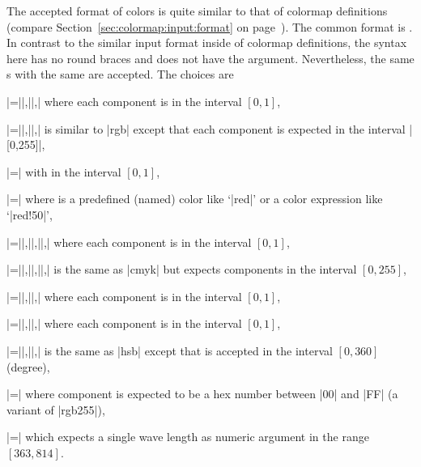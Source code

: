 {{The accepted format of colors is quite similar to that of colormap definitions
(compare Section~\ref{sec:colormap:input:format} on
page~\pageref{sec:colormap:input:format}). The common format is
. In contrast to the similar
input format inside of colormap definitions, the syntax here has no round
braces and does not have the  argument. Nevertheless, the same
s with the same  are accepted. The choices
are
%
\begin{description}
        \renewcommand\makelabel[1]{\declaretext{#1}}%
        \setlength{\labelsep}{0pt}
    \item[rgb] |=||,||,| where each
        component is in the interval $[0,1]$,
    \item[rgb255] |=||,||,| is similar to
        |rgb| except that each component is expected in the interval
        |[0,255]|,
    \item[gray] |=| with  in the interval $[0,1]$,
    \item[color] |=| where  is a
        predefined (named) color like `|red|' or a color expression like
        `|red!50|',
    \item[cmyk]
        |=||,||,||,| where
        each component is in the interval $[0,1]$,
    \item[cmyk255]
        |=||,||,||,| is the
        same as |cmyk| but expects components in the interval $[0,255]$,
    \item[cmy] |=||,||,| where each
        component is in the interval $[0,1]$,
    \item[hsb] |=||,||,| where
        each component is in the interval $[0,1]$,
    \item[Hsb] |=||,||,| is the
        same as |hsb| except that  is accepted in the interval
        $[0,360]$ (degree),
    \item[HTML] |=| where
        component is expected to be a hex number between |00| and |FF| (a
        variant of |rgb255|),
    \item[wave] |=| which expects a single wave length as
        numeric argument in the range $[363,814]$.
\end{description}


}}
